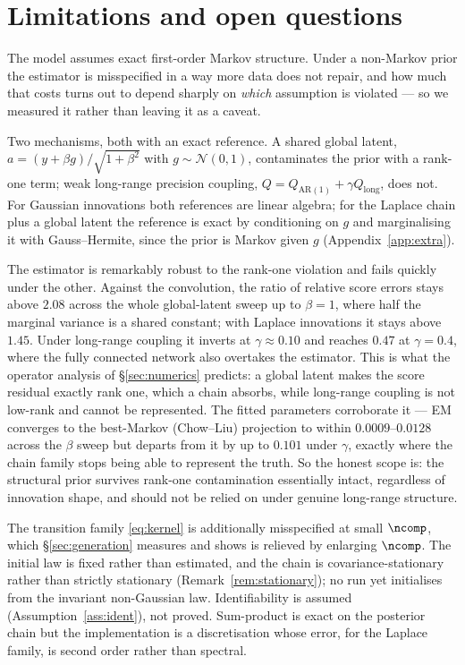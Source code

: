 \documentclass{article}
\begin{document}
\section{Limitations and open questions}
\label{sec:limits}

The model assumes exact first-order Markov structure. Under a non-Markov prior the estimator is
misspecified in a way more data does not repair, and how much that costs turns out to depend
sharply on \emph{which} assumption is violated --- so we measured it rather than leaving it as a
caveat.

Two mechanisms, both with an exact reference. A shared global latent,
$a=(y+\beta g)/\sqrt{1+\beta^{2}}$ with $g\sim\mathcal N(0,1)$, contaminates the prior with a
rank-one term; weak long-range precision coupling, $Q=Q_{\mathrm{AR}(1)}+\gamma Q_{\mathrm{long}}$,
does not. For Gaussian innovations both references are linear algebra; for the Laplace chain plus
a global latent the reference is exact by conditioning on $g$ and marginalising it with
Gauss--Hermite, since the prior is Markov given $g$ (Appendix~\ref{app:extra}).

The estimator is remarkably robust to the rank-one violation and fails quickly under the other.
Against the convolution, the ratio of relative score errors stays above $2.08$ across the whole
global-latent sweep up to $\beta=1$, where half the marginal variance is a shared constant; with
Laplace innovations it stays above $1.45$. Under long-range coupling it inverts at
$\gamma\approx0.10$ and reaches $0.47$ at $\gamma=0.4$, where the fully connected network also
overtakes the estimator. This is what the operator analysis of
\S\ref{sec:numerics} predicts: a global latent makes the score residual exactly rank one, which a
chain absorbs, while long-range coupling is not low-rank and cannot be represented. The fitted
parameters corroborate it --- EM converges to the best-Markov (Chow--Liu) projection to within
$0.0009$--$0.0128$ across the $\beta$ sweep but departs from it by up to $0.101$ under $\gamma$,
exactly where the chain family stops being able to represent the truth. So the honest scope is:
the structural prior survives rank-one contamination essentially intact, regardless of innovation
shape, and should not be relied on under genuine long-range structure.

The transition family \eqref{eq:kernel} is
additionally misspecified at small $\ncomp$, which \S\ref{sec:generation} measures and shows is
relieved by enlarging $\ncomp$. The initial law is fixed rather than estimated, and the chain is
covariance-stationary rather than strictly stationary (Remark~\ref{rem:stationary}); no run yet
initialises from the invariant non-Gaussian law. Identifiability is assumed
(Assumption~\ref{ass:ident}), not proved. Sum-product is exact on the posterior chain but the
implementation is a discretisation whose error, for the Laplace family, is second order rather
than spectral.
\end{document}
